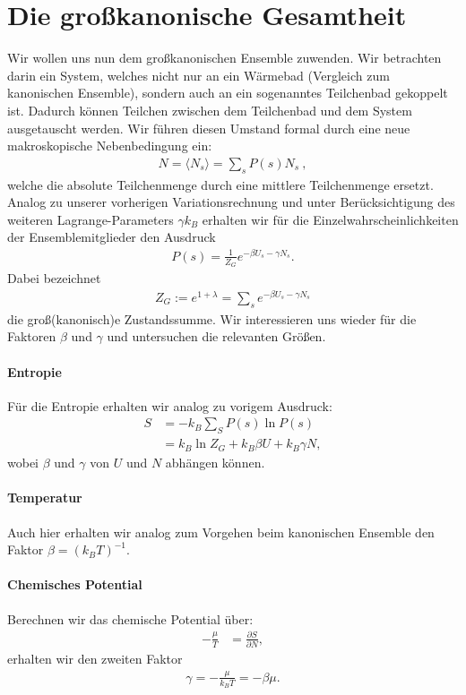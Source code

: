 \section{Die großkanonische Gesamtheit}
Wir wollen uns nun dem großkanonischen Ensemble zuwenden. Wir betrachten darin ein System, welches nicht nur an ein Wärmebad (Vergleich zum kanonischen Ensemble), sondern auch an ein sogenanntes Teilchenbad gekoppelt ist. Dadurch können Teilchen zwischen dem Teilchenbad und dem System ausgetauscht werden. Wir führen diesen Umstand formal durch eine neue makroskopische Nebenbedingung ein:
\begin{align*}
    \boxed{N=\langle N_s\rangle=\sum_s P(s)N_s}\:,
\end{align*}
welche die absolute Teilchenmenge durch eine mittlere Teilchenmenge ersetzt.
Analog zu unserer vorherigen Variationsrechnung und unter Berücksichtigung des weiteren Lagrange-Parameters $\gamma k_B$ erhalten wir für die Einzelwahrscheinlichkeiten der Ensemblemitglieder den Ausdruck 
\begin{align*}
    P(s)=\frac{1}{Z_G}e^{-\beta U_s -\gamma N_s}.
\end{align*}
Dabei bezeichnet 
\begin{align*}
    Z_G:=e^{1+\lambda}=\sum_s e^{-\beta U_s -\gamma N_s}
\end{align*}
die groß(kanonisch)e Zustandssumme.
Wir interessieren uns wieder für die Faktoren $\beta$ und $\gamma$ und untersuchen die relevanten Größen.
\paragraph*{Entropie} Für die Entropie erhalten wir analog zu vorigem Ausdruck:
\begin{align*}
    S&=-k_B\sum_S P(s)\ln P(s)\\
    &=k_B \ln Z_G+k_B \beta U+k_B\gamma N,
\end{align*}
wobei $\beta$ und $\gamma$ von $U$ und $N$ abhängen können.
\paragraph*{Temperatur} Auch hier erhalten wir analog zum Vorgehen beim kanonischen Ensemble den Faktor $\beta=(k_B T)^{-1}$.
\paragraph*{Chemisches Potential} Berechnen wir das chemische Potential über:
\begin{align*}
    -\frac{\mu}{T}&=\frac{\partial S}{\partial N},
\end{align*}
erhalten wir den zweiten Faktor 
\begin{align*}
    \gamma = -\frac{\mu}{k_B T}=-\beta \mu.
\end{align*}
